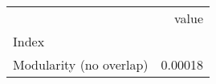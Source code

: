 \begin{tabular}{lr}
\toprule
{} &    value \\
Index                   &          \\
\midrule
Modularity (no overlap) &  0.00018 \\
\bottomrule
\end{tabular}
